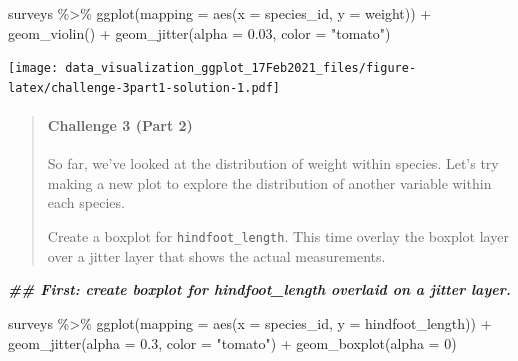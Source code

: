 \documentclass[
]{article}
\newenvironment{Shaded}{\begin{snugshade}}{\end{snugshade}}
\newcommand{\AttributeTok}[1]{\textcolor[rgb]{0.77,0.63,0.00}{#1}}
\newcommand{\DecValTok}[1]{\textcolor[rgb]{0.00,0.00,0.81}{#1}}
\newcommand{\DocumentationTok}[1]{\textcolor[rgb]{0.56,0.35,0.01}{\textbf{\textit{#1}}}}
\newcommand{\FloatTok}[1]{\textcolor[rgb]{0.00,0.00,0.81}{#1}}
\newcommand{\FunctionTok}[1]{\textcolor[rgb]{0.00,0.00,0.00}{#1}}
\newcommand{\NormalTok}[1]{#1}
\newcommand{\SpecialCharTok}[1]{\textcolor[rgb]{0.00,0.00,0.00}{#1}}
\newcommand{\StringTok}[1]{\textcolor[rgb]{0.31,0.60,0.02}{#1}}
\begin{document}
\begin{Shaded}
\begin{Highlighting}[]
\NormalTok{surveys }\SpecialCharTok{\%\textgreater{}\%} 
  \FunctionTok{ggplot}\NormalTok{(}\AttributeTok{mapping =} \FunctionTok{aes}\NormalTok{(}\AttributeTok{x =}\NormalTok{ species\_id, }\AttributeTok{y =}\NormalTok{ weight)) }\SpecialCharTok{+}
  \FunctionTok{geom\_violin}\NormalTok{() }\SpecialCharTok{+} 
  \FunctionTok{geom\_jitter}\NormalTok{(}\AttributeTok{alpha =} \FloatTok{0.03}\NormalTok{, }\AttributeTok{color =} \StringTok{"tomato"}\NormalTok{)  }
\end{Highlighting}
\end{Shaded}

\texttt{[image: data\_visualization\_ggplot\_17Feb2021\_files/figure-latex/challenge-3part1-solution-1.pdf]}

\begin{quote}
\mbox{}%
\hypertarget{challenge-3-part-2}{%
\paragraph{Challenge 3 (Part 2)}\label{challenge-3-part-2}}

So far, we've looked at the distribution of weight within species. Let's
try making a new plot to explore the distribution of another variable
within each species.

Create a boxplot for \texttt{hindfoot\_length}. This time overlay the
boxplot layer over a jitter layer that shows the actual measurements.
\end{quote}

\begin{Shaded}
\begin{Highlighting}[]
\DocumentationTok{\#\#  First: create boxplot for hindfoot\_length\textasciigrave{} overlaid on a jitter layer.}
\end{Highlighting}
\end{Shaded}

\begin{Shaded}
\begin{Highlighting}[]
\NormalTok{surveys }\SpecialCharTok{\%\textgreater{}\%} 
  \FunctionTok{ggplot}\NormalTok{(}\AttributeTok{mapping =} \FunctionTok{aes}\NormalTok{(}\AttributeTok{x =}\NormalTok{ species\_id, }\AttributeTok{y =}\NormalTok{ hindfoot\_length)) }\SpecialCharTok{+}
  \FunctionTok{geom\_jitter}\NormalTok{(}\AttributeTok{alpha =} \FloatTok{0.3}\NormalTok{, }\AttributeTok{color =} \StringTok{"tomato"}\NormalTok{) }\SpecialCharTok{+}
  \FunctionTok{geom\_boxplot}\NormalTok{(}\AttributeTok{alpha =} \DecValTok{0}\NormalTok{) }
\end{Highlighting}
\end{Shaded}
\end{document}
